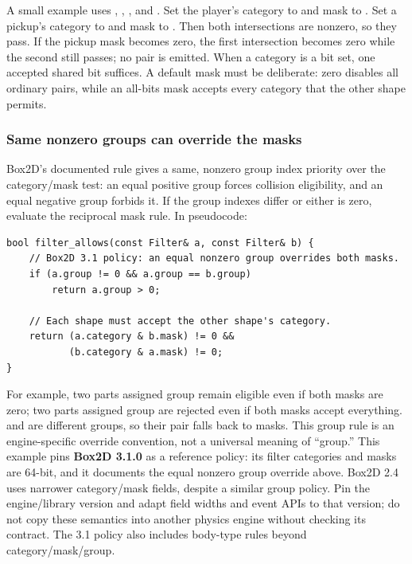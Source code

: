 A small example uses , , , and . Set the player's category to  and mask to . Set a pickup's category to  and mask to . Then both intersections are nonzero, so they pass. If the pickup mask becomes zero, the first intersection becomes zero while the second still passes; no pair is emitted. When a category is a bit set, one accepted shared bit suffices. A default mask must be deliberate: zero disables all ordinary pairs, while an all-bits mask accepts every category that the other shape permits.

\subsubsection{Same nonzero groups can override the masks}\label{05-engine-i-ch017-same-nonzero-groups-can-override-the-masks}

\hypertarget{05-engine-i-ch017-same-nonzero-groups-can-override-the-masks}{}

Box2D's documented rule gives a same, nonzero group index priority over the category/mask test: an equal positive group forces collision eligibility, and an equal negative group forbids it. If the group indexes differ or either is zero, evaluate the reciprocal mask rule. In pseudocode:

\begin{verbatim}
bool filter_allows(const Filter& a, const Filter& b) {
    // Box2D 3.1 policy: an equal nonzero group overrides both masks.
    if (a.group != 0 && a.group == b.group)
        return a.group > 0;

    // Each shape must accept the other shape's category.
    return (a.category & b.mask) != 0 &&
           (b.category & a.mask) != 0;
}
\end{verbatim}

For example, two parts assigned group  remain eligible even if both masks are zero; two parts assigned group  are rejected even if both masks accept everything.  and  are different groups, so their pair falls back to masks. This group rule is an engine-specific override convention, not a universal meaning of ``group.'' This example pins \textbf{Box2D 3.1.0} as a reference policy: its filter categories and masks are 64-bit, and it documents the equal nonzero group override above. Box2D 2.4 uses narrower category/mask fields, despite a similar group policy. Pin the engine/library version and adapt field widths and event APIs to that version; do not copy these semantics into another physics engine without checking its contract. The 3.1 policy also includes body-type rules beyond category/mask/group.

